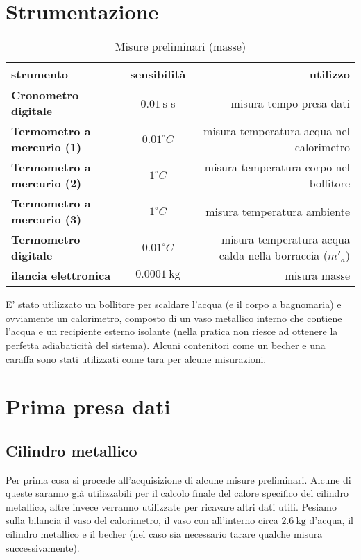 \documentclass{article}
\begin{document}
	
	\section*{Strumentazione}
	\begin{table}[H] \centering
		\begin{small}
			\begin{tabular}{@{}lcr@{}}\toprule
				\textbf{strumento}& \textbf{sensibilità}& \textbf{utilizzo} \\ \midrule
				\textbf{Cronometro digitale}	&	\(0.01 \SI{}{\second}\) s &  misura tempo presa dati\\  \hdashline
				\textbf{Termometro a mercurio (1)}	& \(0.01 ^\circ C\)	 &  misura temperatura acqua nel calorimetro\\  \hdashline
				\textbf{Termometro a mercurio (2)}	& \(1 ^\circ C\)	 &  misura temperatura corpo nel bollitore\\  \hdashline  
				\textbf{Termometro a mercurio (3)}	& \(1 ^\circ C\)	 & misura temperatura ambiente  \\  \hdashline
				\textbf{Termometro digitale}	& \(0.01 ^\circ C\)	 &  misura temperatura acqua calda nella borraccia (\(m'_{a}\))\\  \hdashline
				\textbf{ilancia elettronica} & \(0.0001 \SI{}{\kilogram}\) & misura masse \\ \bottomrule
			\end{tabular}
		\end{small}
		\caption{Misure preliminari (masse)}
	\end{table}
	E' stato utilizzato un bollitore per scaldare l'acqua (e il corpo a bagnomaria) e ovviamente un calorimetro, composto di un vaso metallico interno che contiene l'acqua e un recipiente esterno isolante (nella pratica non riesce ad ottenere la perfetta adiabaticità del sistema). Alcuni contenitori come un becher e una caraffa sono stati utilizzati come tara per alcune misurazioni.
	
	\newpage
	\section{Prima presa dati}
	\subsection{Cilindro metallico}
	Per prima cosa si procede all'acquisizione di alcune misure preliminari. Alcune di queste saranno già utilizzabili per il calcolo finale del calore specifico del cilindro metallico, altre invece verranno utilizzate per ricavare altri dati utili. Pesiamo sulla bilancia il vaso del calorimetro, il vaso con all'interno circa \(2.6 \SI{}{\kilogram}\) d'acqua, il cilindro metallico e il becher (nel caso sia necessario tarare qualche misura successivamente).
	
\end{document}
